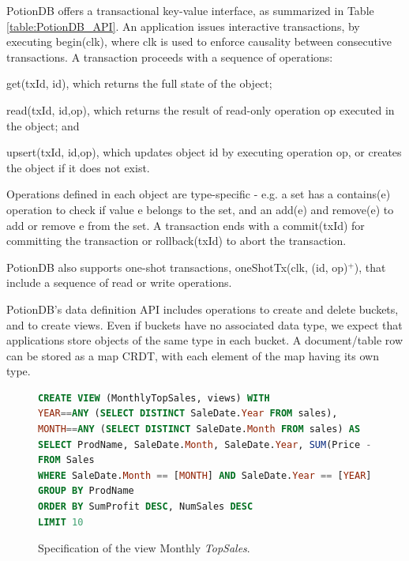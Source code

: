 \documentclass[sigplan,twocolumn,review,anonymous]{acmart}
\newcommand{\code}[1]{\textsf{\small{#1}}}
\begin{document}
PotionDB offers a transactional key-value interface, as summarized in Table \ref{table:PotionDB_API}.
An application issues interactive transactions, by executing \code{begin(clk)},
where \code{clk} is used to enforce causality between consecutive transactions.
A transaction proceeds with a sequence of operations: 
\begin{inparaenum}[(i)] 
\item \code{get(txId, id)}, which returns the full state of the object;
\item \code{read(txId, id,op)}, which returns the result of read-only operation \code{op} executed in the object; and
\item \code{upsert(txId, id,op)}, which updates object \code{id} by executing operation \code{op}, or creates the object if it does not exist.
\end{inparaenum}
Operations defined in each object are type-specific - e.g. a set has a \code{contains(e)} operation to check
if value \code{e} belongs to the set, and an \code{add(e)} and \code{remove(e)} to add or remove \code{e} from the set.
A transaction ends with a \code{commit(txId)} for committing the transaction %
or \code{rollback(txId)} to abort the transaction.

PotionDB also supports one-shot transactions, \code{oneShotTx(clk, (id, op)$^+$)}, that include a sequence of read or
write operations.

PotionDB's data definition API includes operations to create and delete buckets, and 
to create views. Even if buckets have no associated
data type,
we expect that applications 
store objects of the same type in each bucket.  A document/table row can be stored 
as a map CRDT, with each element of the map having its own type. 


\begin{figure}[t]
\small{
\begin{lstlisting}[language=SQL]
CREATE VIEW (MonthlyTopSales, views) WITH 
YEAR==ANY (SELECT DISTINCT SaleDate.Year FROM sales), 
MONTH==ANY (SELECT DISTINCT SaleDate.Month FROM sales) AS
SELECT ProdName, SaleDate.Month, SaleDate.Year, SUM(Price - Cost) AS SumProfit, COUNT(*) AS NumSales
FROM Sales
WHERE SaleDate.Month == [MONTH] AND SaleDate.Year == [YEAR]
GROUP BY ProdName
ORDER BY SumProfit DESC, NumSales DESC
LIMIT 10
\end{lstlisting}}
	\vspace{-5pt}
	\caption{Specification of the view Monthly \emph{TopSales}.}
	\vspace{-15pt}
	\label{fig:viewtopsales}
\end{figure}
\end{document}
